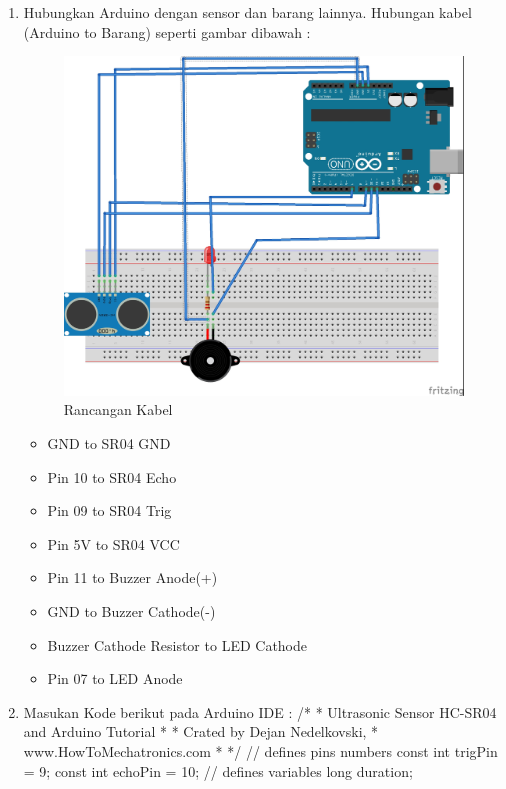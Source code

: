 \documentclass{article}
\begin{document}
\begin{enumerate}
	\item Hubungkan Arduino dengan sensor dan barang lainnya. Hubungan kabel (Arduino to Barang) seperti gambar dibawah : 
\begin{figure}[ht]
\centerline{\includegraphics[width=1\textwidth]{figures/rancangan.jpg}}
\caption{Rancangan Kabel}
\label{rancangankabel}
\end{figure}
		\begin{itemize}
			\item GND to SR04 GND
			\item Pin 10 to SR04 Echo
			\item Pin 09 to SR04 Trig
			\item Pin 5V to SR04 VCC
			\item Pin 11 to Buzzer Anode(+)
			\item GND to Buzzer Cathode(-)
			\item Buzzer Cathode Resistor to LED Cathode
			\item Pin 07 to LED Anode
		\end{itemize}
	\item Masukan Kode berikut pada Arduino IDE : 
\begingroup\makeatletter\def\@currenvir{verbatim}
\verbatim
    /*
    * Ultrasonic Sensor HC-SR04 and Arduino Tutorial
    *
    * Crated by Dejan Nedelkovski,
    * www.HowToMechatronics.com
    *
    */
    // defines pins numbers
    const int trigPin = 9;
    const int echoPin = 10;
    // defines variables
    long duration;

\end{enumerate}
\end{document}
